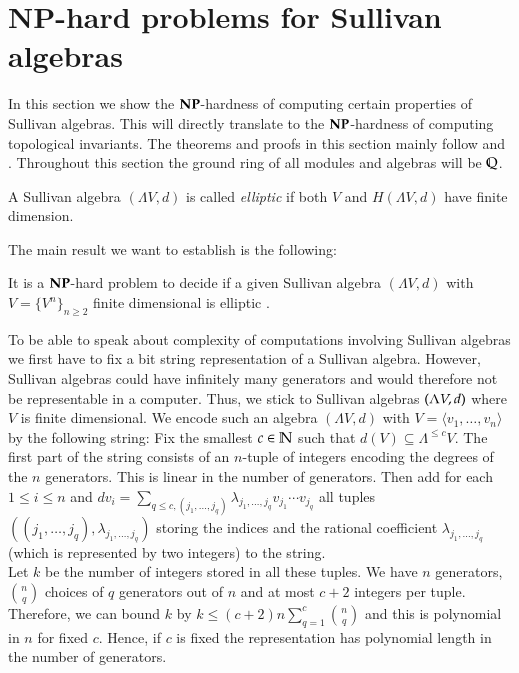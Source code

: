  \section{NP-hard problems for Sullivan algebras} \label{sec:NPSullivan}
 
 In this section we show the 
 $\mathbf{NP}$-hardness of computing certain properties of Sullivan algebras. This will directly 
 translate to the $\mathbf{NP}$-hardness of computing topological invariants.
 The theorems and proofs in this section mainly follow  \cite{Lechuga2000} and
 \cite{Garvin2003}. Throughout this section the ground ring of all modules and algebras
 will be $\mathbb{Q}$.


 \begin{Definition}
  A Sullivan algebra $(\Lambda V, d)$ is called \emph{elliptic} if both $V$ and $H(\Lambda V,d)$ have
  finite dimension.
 \end{Definition}
 
 The main result we want to establish is the following:
 
 \begin{Theorem}
 \label{thm:DecidingEllipticityIsNpHard}
  It is a $\mathbf{NP}$-hard problem to decide if a given Sullivan algebra $(\Lambda V,d)$ with $V = { \{ V^n \} }_{n \geq 2}  $ finite dimensional 
  is elliptic . 
 \end{Theorem}
 
 \begin{Remark}
 \label{rem:CodingOfSullivanAlgebras}
  To be able to speak about complexity of computations involving Sullivan algebras we first have to fix a bit string 
  representation of a Sullivan algebra. However, Sullivan algebras could have infinitely many generators and would therefore
  not be representable in a computer. Thus, we stick to Sullivan algebras $(\Lambda V,d)$ where $V$ is finite dimensional. 
  We encode such an algebra $(\Lambda V, d)$ with $V = \langle v_1, \ldots , v_n \rangle$
  by the following string: \newline
  Fix the smallest $c \in \mathbb{N}$ such that $d(V) \subseteq \Lambda^{ \leq c} V$.
  The first part of the string consists of 
  an $n$-tuple of integers encoding the degrees of the $n$ generators. This is linear in the number
  of generators. Then add for each $ 1 \leq i \leq n$
  and $d v_i = \sum_{q \leq c, (j_1, \ldots, j_q)} \lambda_{j_1, \ldots, j_q} v_{j_1} \cdots v_{j_q}$ all tuples 
  $(({j_1, \ldots, j_q}), \lambda_{j_1, \ldots, j_q})$ storing the indices and the rational coefficient 
  $\lambda_{j_1, \ldots, j_q}$ (which is represented by two integers) to the string. \\
  Let $k$ be the number of integers stored in all these tuples. We have $n$ generators,
  ${ n \choose q}$ choices of $q$ generators out of $n$ and at most $c + 2$ integers per tuple. Therefore, we can bound $k$ by
  $k \leq (c + 2)n \sum_{q = 1}^c { n \choose q} $ and this is polynomial in $n$ for fixed $c$.
  Hence, if $c$ is fixed the representation has polynomial length in the number
  of generators.
  
 \end{Remark}


